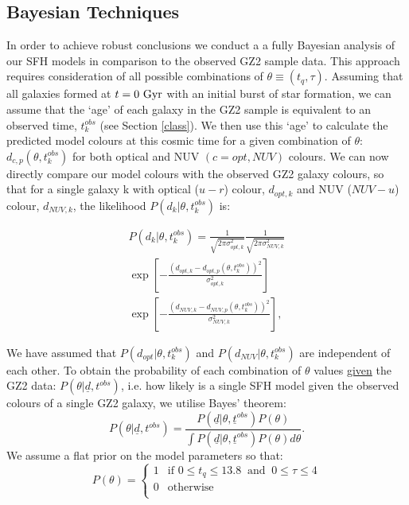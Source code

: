 \documentclass[useAMS,usenatbib]{mn2e}
\def\changed    {\color{titlecol} }
\begin{document}
\subsection{Bayesian Techniques}\label{stats}
In order to achieve robust conclusions we conduct a a fully Bayesian analysis \citep{Sivia, MacKay} of our SFH models in comparison to the observed GZ2 sample data. This approach requires consideration of all possible combinations of $\theta \equiv (t_{q}, \tau)$. Assuming that all galaxies formed at $t=0~\rm{Gyr}$ with an initial burst of star formation, we can assume that the `age' of each galaxy in the GZ2 sample is equivalent to an observed time, $t^{obs}_{k}$ (see Section \ref{class}). We then use this  `age' to calculate the predicted model colours at this cosmic time for a given combination of $\theta$: $d_{c,p}(\theta, t^{obs}_{k})$ for both optical and NUV $(c={opt,NUV})$ colours. We can now directly compare our model colours with the observed GZ2 galaxy colours, so that for a single galaxy k with optical ($u-r$) colour, $d_{opt, k}$ and NUV ($NUV-u$) colour, $d_{NUV,k}$, the {\changed likelihood $P(d_{k}|\theta, t^{obs}_{k})$ is}:

\begin{multline}\label{like}
P(d_{k}|\theta, t^{obs}_{k}) = \frac{1}{\sqrt{2\pi\sigma_{opt, k}^2}}\frac{1}{\sqrt{2\pi\sigma_{NUV, k}^2}} \\ \exp{\left[ - \frac{(d_{opt, k} - d_{opt, p}(\theta, t_{k}^{obs}))^2}{\sigma_{opt, k}^2} \right]} \\ \exp{\left[ - \frac{(d_{NUV, k} - d_{NUV, p}(\theta, t_{k}^{obs}))^2}{\sigma_{NUV, k}^2} \right]},
\end{multline}

We have assumed that $P(d_{opt}|\theta, t^{obs}_{k})$ and $P(d_{NUV}|\theta, t^{obs}_{k})$ are independent of each other. To obtain the probability of each combination of $\theta$ values \underline{given} the GZ2 data: $P(\theta|\underline{d}, t^{obs})$, i.e. how likely is a single SFH model given the observed colours of a single GZ2 galaxy, {\changed we utilise Bayes' theorem}:
\begin{equation}\label{big}
P(\theta|\underline{d}, t^{obs}) = \frac{P(\underline{d}|\theta, \underline{t}^{obs})P(\theta)}{\int P(\underline{d}|\theta, \underline{t}^{obs})P(\theta) d\theta}.
\end{equation}
{\changed We assume a flat prior on the model parameters so that:
\begin{equation}\label{prior}
P(\theta) =
\begin{cases}
1 & \text{if } 0 \leq t_q \leq 13.8 ~  \text{ and } ~ 0 \leq \tau \leq 4\\
0 & \text{otherwise} \\
\end{cases}
\end{equation}}
\end{document}
